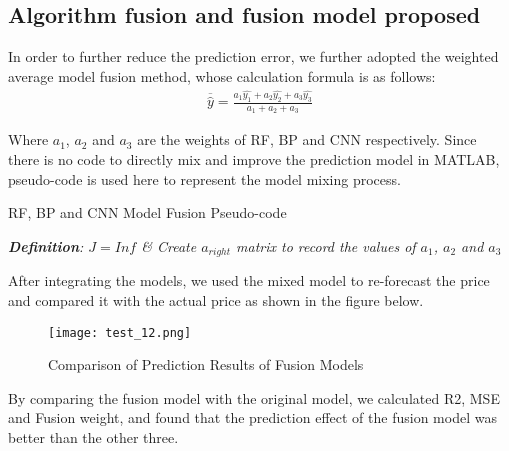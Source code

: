 \subsection{Algorithm fusion and fusion model proposed}
In order to further reduce the prediction error, we further adopted the weighted average model fusion method, whose calculation formula is as follows:
\begin{align}
    \overline{\widehat{y}}=\frac{a_1\widehat{y_1}+a_2\widehat{y_2}+a_3\widehat{y_3}}{a_1+a_2+a_3}
\end{align}

Where $a_1$, $a_2$ and $a_3$ are the weights of RF, BP and CNN respectively.
Since there is no code to directly mix and improve the prediction model in MATLAB, pseudo-code is used here to represent the model mixing process.

\begin{algorithm}[H]
    \caption{RF, BP and CNN Model Fusion Pseudo-code}
    \SetAlgoLined
    \emph{\textbf{Definition}: $J=Inf$  \& Create $a_{right}$ matrix to record the values of $a_1$, $a_2$ and $a_3$}\;
  \end{algorithm}

  After integrating the models, we used the mixed model to re-forecast the price and compared it with the actual price as shown in the figure below.
\begin{figure}[H]  %
    \centering  %
    \texttt{[image: test\_12.png]} %
    \caption{Comparison of Prediction Results of Fusion Models} %
    \vspace{-0.5cm}
\end{figure}
By comparing the fusion model with the original model, we calculated R2, MSE and Fusion weight, and found that the prediction effect of the fusion model was better than the other three.

